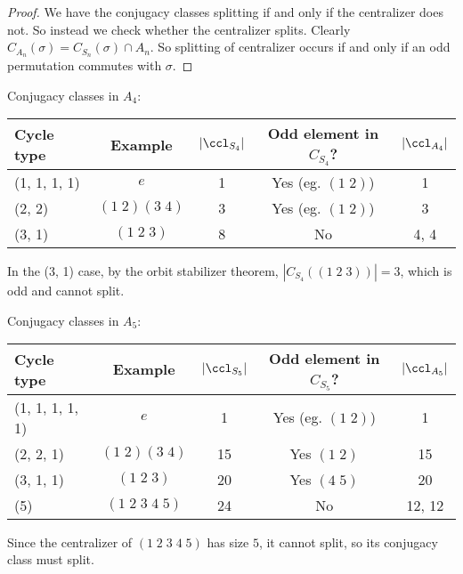 \documentclass[a4paper]{article}
\begin{document}
  \begin{proof}
    We have the conjugacy classes splitting if and only if the centralizer does not. So instead we check whether the centralizer splits. Clearly $C_{A_n}(\sigma) = C_{S_n}(\sigma)\cap A_n$. So splitting of centralizer occurs if and only if an odd permutation commutes with $\sigma$.
  \end{proof}

  \begin{eg}
    Conjugacy classes in $A_4$:\vspace{4pt}                                                         \\
    \begin{tabular}{lcccc}
      \toprule
      Cycle type   & Example          & $|\ccl_{S_4}|$ & Odd element in $C_{S_4}$? & $|\ccl_{A_4}|$ \\
      \midrule
      (1, 1, 1, 1) & $e$              & 1              & Yes (eg. $(1\; 2)$)      & 1              \\
      (2, 2)       & $(1\; 2)(3\; 4)$ & 3              & Yes (eg. $(1\; 2)$)      & 3              \\
      (3, 1)       & $(1\; 2\; 3)$    & 8              & No                        & 4, 4           \\
      \bottomrule
    \end{tabular}

    \vspace{4pt}
    \noindent In the (3, 1) case, by the orbit stabilizer theorem, $|C_{S_4}((1\; 2\; 3))| = 3$, which is odd and cannot split. 
  \end{eg}

  \begin{eg}
    Conjugacy classes in $A_5$:\vspace{4pt}                                                                 \\
    \begin{tabular}{lcccc}
      \toprule
      Cycle type      & Example               & $|\ccl_{S_5}|$ & Odd element in $C_{S_5}$? & $|\ccl_{A_5}|$ \\
      \midrule
      (1, 1, 1, 1, 1) & $e$                   & 1              & Yes (eg. $(1\; 2)$)      & 1              \\
      (2, 2, 1)       & $(1\; 2)(3\; 4)$      & 15             & Yes $(1\; 2)$             & 15             \\
      (3, 1, 1)       & $(1\; 2\; 3)$         & 20             & Yes $(4\; 5)$             & 20             \\
      (5)             & $(1\; 2\; 3\; 4\; 5)$ & 24             & No                        & 12, 12         \\
      \bottomrule
    \end{tabular}

    Since the centralizer of $(1\; 2\; 3\; 4\; 5)$ has size $5$, it cannot split, so its conjugacy class must split.
  \end{eg}
\end{document}
